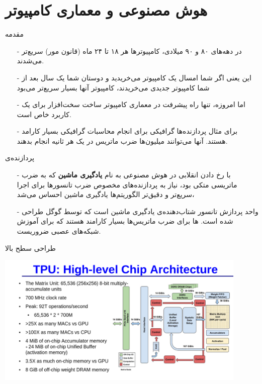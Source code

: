 \section{هوش مصنوعی و معماری کامپیوتر}
\begin{frame}{مقدمه}
\begin{itemize}\itemr
\item[-]
در دهه‌های ۸۰ و ۹۰ میلادی، کامپیوتر‌‌ها هر ۱۸ تا ۲۴ ماه (قانون مور) سریع‌تر می‌شدند.
\item[-]
این یعنی اگر شما امسال یک کامپیوتر می‌خریدید و دوستان شما یک سال بعد از شما کامپیوتر جدیدی می‌خریدند، کامپیوتر‌ آنها بسیار سریع‌تر می‌بود
\item[-]
اما امروزه، تنها راه پیشرفت در معماری کامپیوتر ساخت سخت‌افزار برای یک کاربرد خاص است.
\item[-]
برای مثال پردازند‌ه‌ها گرافیکی
برای انجام محاسبات گرافیکی بسیار کارامد هستند. آنها می‌توانند میلیون‌ها ضرب ماتریس در یک هر ثانیه انجام بدهند.
\end{itemize}
\end{frame}

\begin{frame}{پردازنده‌ی }
\begin{itemize}\itemr
\item[-]
با رخ دادن انقلابی در هوش مصنوعی به نام \textbf{یادگیری ماشین} که به ضرب ماتریسی متکی بود، نیاز به پردازنده‌های مخصوص ضرب تانسور‌ها برای اجرا سریع‌تر و دقیق‌تر الگوریتم‌ها یادگیری ماشین احساس می‌شد،
\item[-]
واحد پردازش تانسور
شتاب‌دهنده‌ی یادگیری ماشین است که توسط گوگل طراحی شده است. 
ها
برای ضرب ماتریس‌ها بسیار کارامند هستند که برای آموزش شبکه‌های عصبی 
ضروریست.
\end{itemize}
\end{frame}

\begin{frame}{طراحی سطح بالا}
\begin{center}
\includegraphics[width=0.9\textwidth, height=0.8\textheight]{docs/images/tpu-1}
\end{center}
\end{frame}

